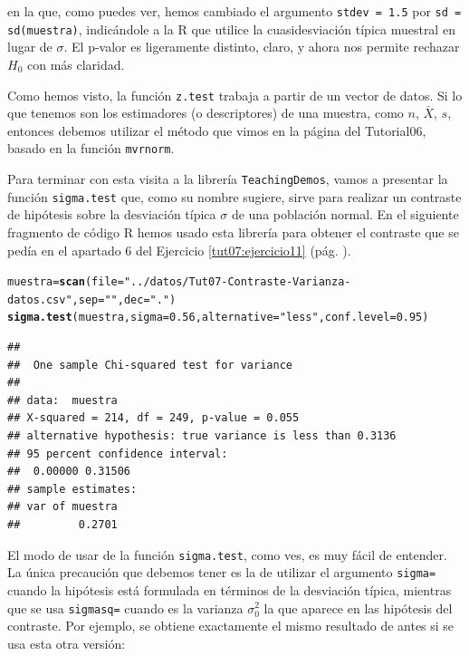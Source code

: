 \documentclass[10pt,a4paper]{article}\usepackage[]{graphicx}\usepackage[]{color}
\makeatletter
\newcommand{\hlnum}[1]{\textcolor[rgb]{0.686,0.059,0.569}{#1}}%
\newcommand{\hlstr}[1]{\textcolor[rgb]{0.192,0.494,0.8}{#1}}%
\newcommand{\hlstd}[1]{\textcolor[rgb]{0.345,0.345,0.345}{#1}}%
\newcommand{\hlkwb}[1]{\textcolor[rgb]{0.69,0.353,0.396}{#1}}%
\newcommand{\hlkwc}[1]{\textcolor[rgb]{0.333,0.667,0.333}{#1}}%
\newcommand{\hlkwd}[1]{\textcolor[rgb]{0.737,0.353,0.396}{\textbf{#1}}}%
\newenvironment{kframe}{%
 \def\at@end@of@kframe{}%
 \ifinner\ifhmode%
  \def\at@end@of@kframe{\end{minipage}}%
  \begin{minipage}{\columnwidth}%
 \fi\fi%
 \def\FrameCommand##1{\hskip\@totalleftmargin \hskip-\fboxsep
 \colorbox{shadecolor}{##1}\hskip-\fboxsep
     \hskip-\linewidth \hskip-\@totalleftmargin \hskip\columnwidth}%
 \MakeFramed {\advance\hsize-\width
   \@totalleftmargin\z@ \linewidth\hsize
   \@setminipage}}%
 {\par\unskip\endMakeFramed%
 \at@end@of@kframe}
\newenvironment{knitrout}{}{} %
\newcounter {cont01}
\makeatother
\begin{document}
en la que, como puedes ver, hemos cambiado el argumento {\tt stdev = 1.5} por {\tt sd = sd(muestra)}, indicándole a la R que utilice la cuasidesviación típica muestral en lugar de $\sigma$. El p-valor es ligeramente distinto, claro, y ahora nos permite rechazar $H_0$ con más claridad.

Como hemos visto, la función {\tt z.test} trabaja a partir de un vector de datos. Si lo que tenemos son los estimadores (o descriptores) de una muestra, como $n$, $\bar X$, $s$, entonces debemos utilizar el método que vimos en la página \pageref{tut06-tut06:subsubsec:CocinandoMuestras} del Tutorial06, basado en la función {\tt mvrnorm}.


Para terminar con esta visita a la librería {\tt TeachingDemos}, vamos a presentar la función {\tt sigma.test} que, como su nombre sugiere, sirve para realizar un contraste de hipótesis sobre la desviación típica $\sigma$ de una población normal. En el siguiente fragmento de código R hemos usado esta librería para obtener el contraste que se pedía en el apartado $6$ del Ejercicio \ref{tut07:ejercicio11}  (pág. \pageref{tut07:ejercicio11}).

\begin{knitrout}
\color{fgcolor}\begin{kframe}
\begin{alltt}
\hlstd{muestra} \hlkwb{=} \hlkwd{scan}\hlstd{(}\hlkwc{file}\hlstd{=}\hlstr{"../datos/Tut07-Contraste-Varianza-datos.csv"}\hlstd{,}\hlkwc{sep}\hlstd{=}\hlstr{" "}\hlstd{,}\hlkwc{dec}\hlstd{=}\hlstr{"."}\hlstd{)}
\hlkwd{sigma.test}\hlstd{(muestra,}\hlkwc{sigma}\hlstd{=}\hlnum{0.56}\hlstd{,}\hlkwc{alternative}\hlstd{=}\hlstr{"less"}\hlstd{,}\hlkwc{conf.level}\hlstd{=}\hlnum{0.95}\hlstd{)}
\end{alltt}
\begin{verbatim}
## 
## 	One sample Chi-squared test for variance
## 
## data:  muestra
## X-squared = 214, df = 249, p-value = 0.055
## alternative hypothesis: true variance is less than 0.3136
## 95 percent confidence interval:
##  0.00000 0.31506
## sample estimates:
## var of muestra 
##         0.2701
\end{verbatim}
\end{kframe}
\end{knitrout}

El modo de usar de la función {\tt sigma.test}, como ves, es muy fácil de entender. La única precaución que debemos tener es la de utilizar el argumento {\tt sigma=} cuando la hipótesis está formulada en términos de la desviación típica, mientras que se usa {\tt sigmasq=} cuando es la varianza $\sigma_0^2$ la que aparece en las hipótesis del contraste. Por ejemplo, se obtiene exactamente el mismo resultado de antes si se usa esta otra versión:
\end{document}
